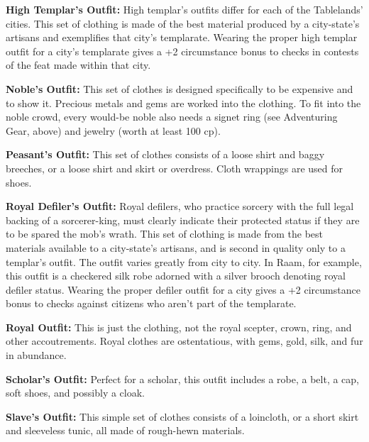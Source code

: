 \textbf{High Templar's Outfit:} High templar's outfits differ for each of the Tablelands' cities. This set of clothing is made of the best material produced by a city-state's artisans and exemplifies that city's templarate. Wearing the proper high templar outfit for a city's templarate gives a +2 circumstance bonus to  checks in contests of the  feat made within that city.


\textbf{Noble's Outfit:} This set of clothes is designed specifically to be expensive and to show it. Precious metals and gems are worked into the clothing. To fit into the noble crowd, every would-be noble also needs a signet ring (see Adventuring Gear, above) and jewelry (worth at least 100 cp).

\textbf{Peasant's Outfit:} This set of clothes consists of a loose shirt and baggy breeches, or a loose shirt and skirt or overdress. Cloth wrappings are used for shoes.

\textbf{Royal Defiler's Outfit:} Royal defilers, who practice sorcery with the full legal backing of a sorcerer-king, must clearly indicate their protected status if they are to be spared the mob's wrath. This set of clothing is made from the best materials available to a city-state's artisans, and is second in quality only to a templar's outfit. The outfit varies greatly from city to city. In Raam, for example, this outfit is a checkered silk robe adorned with a silver brooch denoting royal defiler status. Wearing the proper defiler outfit for a city gives a +2 circumstance bonus to  checks against citizens who aren't part of the templarate.

\textbf{Royal Outfit:} This is just the clothing, not the royal scepter, crown, ring, and other accoutrements. Royal clothes are ostentatious, with gems, gold, silk, and fur in abundance.

\textbf{Scholar's Outfit:} Perfect for a scholar, this outfit includes a robe, a belt, a cap, soft shoes, and possibly a cloak.

\textbf{Slave's Outfit:} This simple set of clothes consists of a loincloth, or a short skirt and sleeveless tunic, all made of rough-hewn materials.

